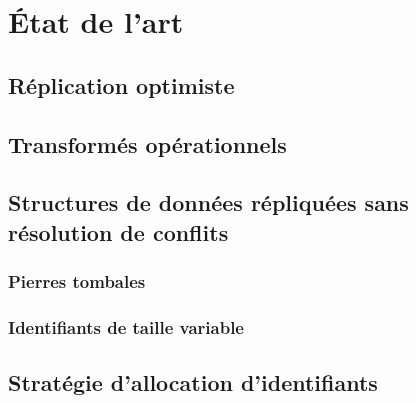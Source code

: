 
\section{État de l'art}

\subsection{Réplication optimiste}

\subsection{Transformés opérationnels}

\subsection{Structures de données répliquées sans résolution de conflits}

\subsubsection{Pierres tombales}

\subsubsection{Identifiants de taille variable}

\subsection{Stratégie d'allocation d'identifiants}

